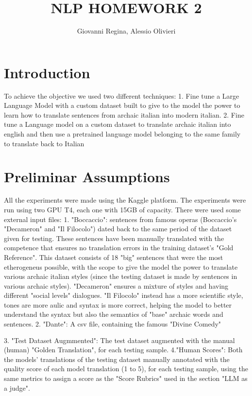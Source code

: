 \documentclass{article}
\title{NLP HOMEWORK 2}
\author{Giovanni Regina, Alessio Olivieri}
\begin{document}
\maketitle


\section{Introduction}
To achieve the objective we used two different techniques: 1. Fine tune a Large Language Model with a custom dataset built to give to the model the power to learn how to translate sentences from archaic italian into modern italian. 2. Fine tune a Language model on a custom dataset to translate archaic italian into english and then use a pretrained language model belonging to the same family to translate back to Italian 

\section{Preliminar Assumptions}

All the experiments were made using the Kaggle platform. The experiments were run using two GPU T4, each one with 15GB of capacity. There were used some external input files: 1. "Boccaccio": sentences from famous operas (Boccaccio's "Decameron" and "Il Filocolo") dated back to the same period of the dataset given for testing. These sentences have been manually translated with the competence that ensures no translation errors in the training dataset's "Gold Reference". This dataset consists of 18 "big" sentences that were the most etherogeneus possible, with the scope to give the model the power to translate various archaic italian styles (since the testing dataset is made by sentences in various archaic styles). "Decameron" ensures a mixture of styles and having different "social levels" dialogues. "Il Filocolo" instead has a more scientific style, tones are more aulic and syntax is more correct, helping the model to better understand the syntax but also the semantics of "base" archaic words and sentences. 
2. "Dante": A csv file, containing the famous "Divine Comedy"

3. "Test Dataset Augmmented": The test dataset augmented with the manual (human) "Golden Translation", for each testing sample.
4."Human Scores": Both the models' translations of the testing dataset manually annotated with the quality score of each model translation (1 to 5), for each testing sample, using the same metrics to assign a score as the "Score Rubrics" used in the section "LLM as a judge". 
\end{document}
